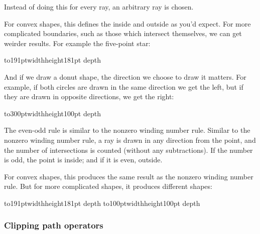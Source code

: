 Instead of doing this for every ray, an arbitrary ray is chosen.

For convex shapes, this defines the inside and outside as you'd expect.
For more complicated boundaries, such as those which intersect themselves, we can get weirder results.
For example the five-point star:

\bgroup
\centerline{%
\hbox to191pt{\vrule width\z@ height181pt depth\z@%
\hfil}}
\egroup

\bigskip

And if we draw a donut shape, the direction we choose to draw it matters.
For example, if both circles are drawn in the same direction we get the left, but if they are drawn in opposite
directions, we get the right:

\bigskip

\bgroup
\centerline{%
\hbox to300pt{\vrule width\z@ height100pt depth\z@%
\hfil}}
\egroup

\bigskip


The even-odd rule is similar to the nonzero winding number rule.
Similar to the nonzero winding number rule, a ray is drawn in any direction from the point, and the number of
intersections is counted (without any subtractions).
If the number is odd, the point is inside; and if it is even, outside.

For convex shapes, this produces the same result as the nonzero winding number rule.
But for more complicated shapes, it produces different shapes:

\bigskip

\bgroup
\centerline{%
\hbox to191pt{\vrule width\z@ height181pt depth\z@%
\hfil}\kern100pt%
\hbox to100pt{\vrule width\z@ height100pt depth\z@%
\hfil}%
}
\egroup

\subsubsection{Clipping path operators}

